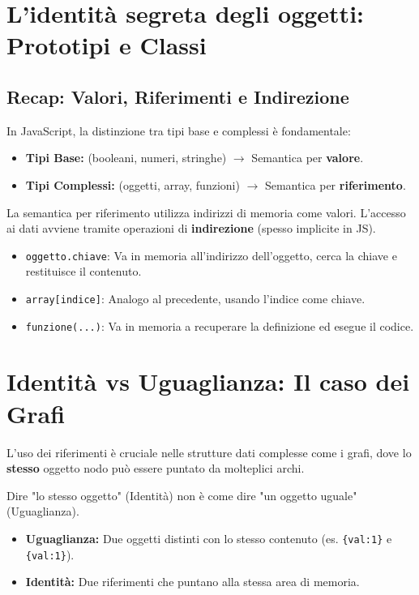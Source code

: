 \section{L'identità segreta degli oggetti: Prototipi e Classi}

\subsection{Recap: Valori, Riferimenti e Indirezione}
In JavaScript, la distinzione tra tipi base e complessi è fondamentale:
\begin{itemize}
    \item \textbf{Tipi Base:} (booleani, numeri, stringhe) $\rightarrow$ Semantica per \textbf{valore}.
    \item \textbf{Tipi Complessi:} (oggetti, array, funzioni) $\rightarrow$ Semantica per \textbf{riferimento}.
\end{itemize}

La semantica per riferimento utilizza indirizzi di memoria come valori. L'accesso ai dati avviene tramite operazioni di \textbf{indirezione} (spesso implicite in JS).

\begin{definition}
    \begin{itemize}
        \item \texttt{oggetto.chiave}: Va in memoria all'indirizzo dell'oggetto, cerca la chiave e restituisce il contenuto.
        \item \texttt{array[indice]}: Analogo al precedente, usando l'indice come chiave.
        \item \texttt{funzione(...)}: Va in memoria a recuperare la definizione ed esegue il codice.
    \end{itemize}
\end{definition}

\section{Identità vs Uguaglianza: Il caso dei Grafi}
L'uso dei riferimenti è cruciale nelle strutture dati complesse come i grafi, dove lo \textbf{stesso} oggetto nodo può essere puntato da molteplici archi.

\begin{concept}[Identità]
Dire "lo stesso oggetto" (Identità) non è come dire "un oggetto uguale" (Uguaglianza).
\begin{itemize}
    \item \textbf{Uguaglianza:} Due oggetti distinti con lo stesso contenuto (es. \texttt{\{val:1\}} e \texttt{\{val:1\}}).
    \item \textbf{Identità:} Due riferimenti che puntano alla stessa area di memoria.
\end{itemize}
\end{concept}

